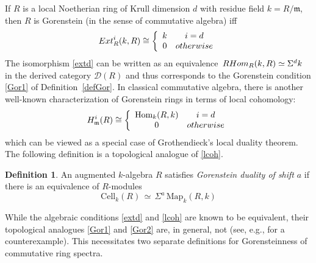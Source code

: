 \documentclass[11pt]{amsart}
\newtheorem{prop}[theorem]{Proposition}
\theoremstyle{definition}
\newtheorem{defi}[theorem]{Definition}
\theoremstyle{remark}
\numberwithin{equation}{section}
\newcommand{\la}{\label}
\newcommand{\Map}{\mathrm{Map}}
\newcommand{\Cell}{\mathrm{Cell}}
\def\D{\mathcal{D}}
\def\Hom{\mathrm{Hom}}
\begin{document}
If $R$ is a local Noetherian ring of Krull dimension $d$ with residue field $ k = R/\mathfrak{m}$, then $R$ is Gorenstein (in the sense of commutative algebra) iff
%
\begin{equation}
\la{extd} 
{\rm Ext}^i_R(k,R) \cong \left\{
\begin{array}{cc}
k     & i= d  \\
0     & {\rm otherwise}
\end{array}
\right.
\end{equation}
%
The isomorphism \eqref{extd} can be written as an equivalence $\, {\rm RHom}_R(k,R) \simeq \Sigma^d k \,$ in the derived category $ \D(R)$ and thus corresponds to the Gorenstein condition \eqref{Gor1} of Definition~\ref{defGor}. In classical commutative algebra, there is another well-known characterization of Gorenstein rings in terms of local cohomology:  
%
\begin{equation}
\la{lcoh} 
H_{\mathfrak{m}}^i(R) \cong \left\{
\begin{array}{cc}
\Hom_k(R,k)     & i=d  \\
0     & {\rm otherwise}
\end{array}
\right.
\end{equation}
%
which can be viewed as a special case of Grothendieck's local duality theorem.
The following definition is a topological analogue of \eqref{lcoh}.
%
\begin{defi}
\la{Gordual}
An augmented $k$-algebra $R$ satisfies {\it Gorenstein duality of shift} $a$ if there is an equivalence of 
$R$-modules
%
\begin{equation}
\la{Gor2}
\Cell_k(R) \,\simeq\, \Sigma^a\,\Map_k(R,k)
\end{equation}
\end{defi}
%
While the algebraic conditions \eqref{extd} and \eqref{lcoh} are known to be equivalent, their topological analogues \eqref{Gor1} and \eqref{Gor2} are, in general, not (see, e.g., \cite[Remark 2.11]{BCHV21} for a counterexample). This necessitates two separate definitions for Gorensteinness of commutative ring spectra.

\vspace{1ex}

%
%
\end{document}
